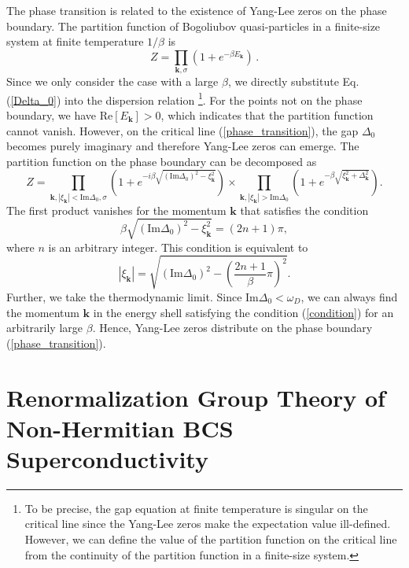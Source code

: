\documentclass[aps,onecolumn,superscriptaddress,notitlepage,longbibliography]{revtex4-1}
\begin{document}
The phase transition is related to the existence of Yang-Lee zeros on the phase boundary. The partition function of Bogoliubov quasi-particles in a finite-size system at finite temperature $1/\beta$ is
\begin{equation}
  Z = \prod_{\bm{k},\sigma} (1 + e^{-\beta E_{\bm{k}}})\,.
\end{equation}
 Since we only consider the case with a large $\beta$, we directly substitute Eq. (\ref{Delta_0}) into the dispersion relation \footnote{To be precise, the gap equation at finite temperature is singular on the critical line since the Yang-Lee zeros make the expectation value ill-defined. However, we can define the value of the partition function on the critical line from the continuity of the partition function in a finite-size system.}. For the points not on the phase boundary, we have $\text{Re}
 [E_{\bm{k}}] > 0$, which indicates that the
 partition function cannot vanish. However, on the critical line (\ref{phase_transition}), the gap $\Delta_0$ becomes purely imaginary and therefore Yang-Lee zeros can emerge. The partition function on the phase boundary can be decomposed as
\begin{equation}
  Z = \prod_{\bm{k},|\xi_{\bm{k}}|<\text{Im}\Delta_0,\sigma} \left( 1 + e^{- i \beta \sqrt{\left( \text{Im}\Delta_0 \right)^2 - \xi_{\bm{k}}^2}} \right)\times \prod_{\bm{k},|\xi_{\bm{k}}|>\text{Im}\Delta_0}\left( 1 + e^{- \beta \sqrt{\xi_{\bm{k}}^2 +\Delta_{\bm{k}}^2 }} \right).
\end{equation}
The first product vanishes for the momentum $\bm{k}$ that satisfies the condition
\begin{equation}
  \beta \sqrt{\left( \text{Im} \Delta_0 \right)^2 - \xi_{\bm{k}}^2} = (2n + 1) \pi,
\end{equation}
where $n$ is an arbitrary integer. This condition is equivalent to
\begin{equation}
 |\xi_{\bm{k}}| = \sqrt{\left( \text{Im} \Delta_0
  \right)^2 - \left( \frac{2 n + 1}{\beta} \pi \right)^2}.
  \label{condition}
\end{equation}
 Further, we take the thermodynamic limit. Since $\text{Im}\Delta_0<\omega_D$, we can always find the momentum $\bm{k}$ in the energy shell satisfying the condition (\ref{condition}) for an arbitrarily large $\beta$. Hence, Yang-Lee zeros distribute on the phase boundary (\ref{phase_transition}). 

 \section{Renormalization Group Theory of Non-Hermitian BCS Superconductivity}\label{RG}
\end{document}
